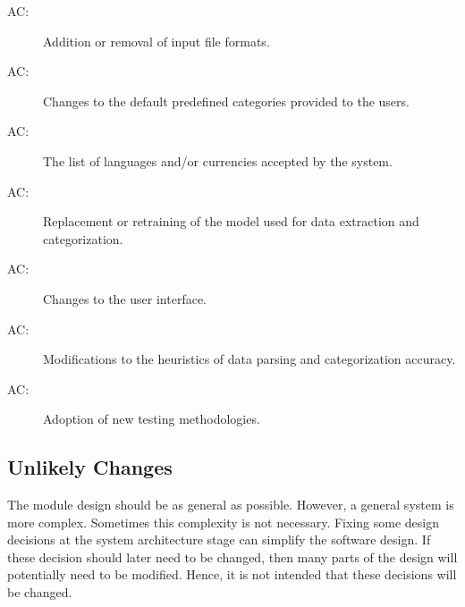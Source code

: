 \documentclass[12pt, titlepage]{article}
\newcounter{acnum}
\newcommand{\actheacnum}{AC\theacnum}
\newcounter{ucnum}
\newcommand{\uctheucnum}{UC\theucnum}
\begin{document}
\begin{description}
  \item[ \actheacnum \label{acInputs}:] Addition or removal of input file formats.
  \item[ \actheacnum \label{acCategories}:] Changes to the default predefined categories provided to the users.
  \item[ \actheacnum \label{acCurrencies}:] The list of languages and/or currencies accepted by the system.
  \item[ \actheacnum \label{acModel}:] Replacement or retraining of the model used for data extraction and categorization.
  \item[ \actheacnum \label{acInterface}:] Changes to the user interface.
  \item[ \actheacnum \label{acHeuristics}:] Modifications to the heuristics of data parsing and categorization accuracy.
  \item[ \actheacnum \label{acTesting}:] Adoption of new testing methodologies. 
\end{description}


\subsection{Unlikely Changes} \label{SecUchange}

The module design should be as general as possible. However, a general system is
more complex. Sometimes this complexity is not necessary. Fixing some design
decisions at the system architecture stage can simplify the software design. If
these decision should later need to be changed, then many parts of the design
will potentially need to be modified. Hence, it is not intended that these
decisions will be changed.

\end{document}
